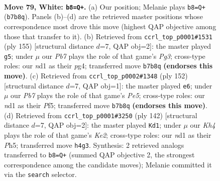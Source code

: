 \documentclass[11pt]{article}
\begin{document}
\clearpage

\begin{figure}[p]\centering
\begin{subfigure}{0.46\textwidth}\centering
\resizebox{\linewidth}{!}{%
\newchessgame
\chessboard[
  setfen={7k/1P6/P3b3/8/7K/8/8/3n4 w - - 3 79},
  showmover=false,
  pgfstyle=straightmove, color=movearrow, markmove={b7-b8}
]}
\caption{}
\end{subfigure}\hfill
\begin{subfigure}{0.46\textwidth}\centering
\resizebox{\linewidth}{!}{%
\newchessgame
\chessboard[
  setfen={8/5p2/6p1/8/6P1/K4k2/3B4/8 b - - 7 78},
  showmover=false,
  pgfstyle=straightmove, color=movearrow, markmove={g6-g5}
]}
\caption{}
\end{subfigure}
\\[4pt]
\begin{subfigure}{0.46\textwidth}\centering
\resizebox{\linewidth}{!}{%
\newchessgame
\chessboard[
  setfen={8/5b2/3K4/4PP2/1k4p1/8/8/8 w - - 0 77},
  showmover=false,
  pgfstyle=straightmove, color=movearrow, markmove={e5-e6}
]}
\caption{}
\end{subfigure}\hfill
\begin{subfigure}{0.46\textwidth}\centering
\resizebox{\linewidth}{!}{%
\newchessgame
\chessboard[
  setfen={8/8/8/7P/4k1P1/7P/4K3/2b5 w - - 1 72},
  showmover=false,
  pgfstyle=straightmove, color=movearrow, markmove={e2-d1}
]}
\caption{}
\end{subfigure}
\caption{\textbf{Move 79, White: \texttt{b8=Q+}.} (a) Our position; Melanie plays \texttt{b8=Q+} (\texttt{b7b8q}). Panels (b)--(d) are the retrieved master positions whose correspondence most drove this move (highest QAP objective among those that transfer to it). (b) Retrieved from \texttt{ccrl\_top\_p0001\#1531} (ply 155) [structural distance $d$=7, QAP obj=2]: the master played \texttt{g5}; under $\mu$ our \emph{Pb7} plays the role of that game's \emph{Pg3}; cross-type roles: our \emph{n}d1 as their \emph{p}g4; transferred move \texttt{b7b8q} \textbf{(endorses this move)}. (c) Retrieved from \texttt{ccrl\_top\_p0002\#1348} (ply 152) [structural distance $d$=7, QAP obj=1]: the master played \texttt{e6}; under $\mu$ our \emph{Pb7} plays the role of that game's \emph{Pe5}; cross-type roles: our \emph{n}d1 as their \emph{P}f5; transferred move \texttt{b7b8q} \textbf{(endorses this move)}. (d) Retrieved from \texttt{ccrl\_top\_p0001\#3250} (ply 142) [structural distance $d$=7, QAP obj=2]: the master played \texttt{Kd1}; under $\mu$ our \emph{Kh4} plays the role of that game's \emph{Ke2}; cross-type roles: our \emph{n}d1 as their \emph{P}h5; transferred move \texttt{h4g3}. Synthesis: 2 retrieved analogs transferred to \texttt{b8=Q+} (summed QAP objective 2, the strongest correspondence among the candidate moves); Melanie committed it via the \texttt{search} selector.}
\label{fig:thought-m156}
\end{figure}
\end{document}
